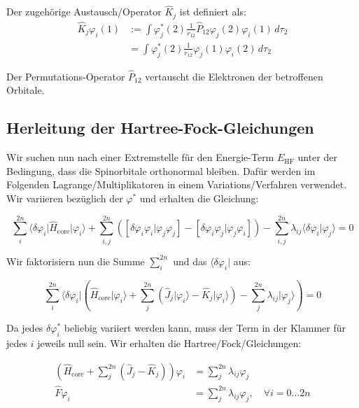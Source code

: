 Der zugehörige Austausch\-/Operator $\hat{K}_j$ ist definiert als:
\begin{align}
  \hat{K}_j \varphi_i(1)&:= 
  \int \varphi_j^*(2) \frac{1}{r_{12}} \hat{P}_{12} \varphi_j(2) \varphi_i(1) \,d\tau_2 \\
  &= \int \varphi_j^*(2) \frac{1}{r_{12}} \varphi_j(1) \varphi_i(2) \,d\tau_2 \nonumber
\end{align}

Der Permutations-Operator $\hat{P}_{12}$ vertauscht die Elektronen der betroffenen Orbitale.

\cite[S. 206]{lewars_2016} \cite[S. 23]{tc2_3}

\subsection{Herleitung der Hartree-Fock-Gleichungen}
Wir suchen nun nach einer Extremstelle für den Energie-Term $E_\text{HF}$ unter der Bedingung, 
dass die Spinorbitale orthonormal bleiben. 
Dafür werden im Folgenden Lagrange\-/Multiplikatoren in einem Variations\-/Verfahren verwendet.
Wir variieren bezüglich der $\varphi^*$ und erhalten die Gleichung:

\begin{equation*}
  \sum_i^{2n} \langle \delta \varphi_i \vert \hat{H}_{\text{core}} \vert \varphi_i \rangle
  + \sum_{i, j}^{2n} \left( 
    \left[ \delta \varphi_i \varphi_i \vert \varphi_j\varphi_j \right] 
    - \left[ \delta \varphi_i\varphi_j \vert \varphi_j\varphi_i \right]
  \right) 
  - \sum_{i,j}^{2n} \lambda_{ij} \langle \delta \varphi_i \vert \varphi_j \rangle
  = 0
\end{equation*}

Wir faktorisiern nun die Summe $\sum_i^{2n}$ und das $\langle \delta \varphi_i \vert$ aus:

\begin{equation*}
  \sum_i^{2n} \langle \delta \varphi_i \vert \left(
    \hat{H}_{\text{core}} \vert \varphi_i \rangle
  + \sum_j^{2n} \left(
    \hat{J}_j \vert \varphi_i \rangle
    - \hat{K}_j \vert \varphi_i \rangle
  \right) 
  - \sum_j^{2n}\lambda_{ij} \vert \varphi_j \rangle \right)
  = 0
\end{equation*}

Da jedes $\delta \varphi_i^*$ beliebig variiert werden kann, muss der Term in der Klammer für jedes $i$ jeweils null sein.
Wir erhalten die Hartree\-/Fock\-/Gleichungen:


\begin{align} \label{uhf}
  \left(\hat{H}_{\text{core}} + \sum_j^{2n} \left( \hat{J}_j - \hat{K}_j \right)\right)\varphi_i &= 
  \sum_j^{2n}\lambda_{ij} \varphi_j \nonumber\\
  \hat{F}\varphi_i &= \sum_j^{2n}\lambda_{ij} \varphi_j, \quad \forall i = 0 \dots 2n
\end{align}

